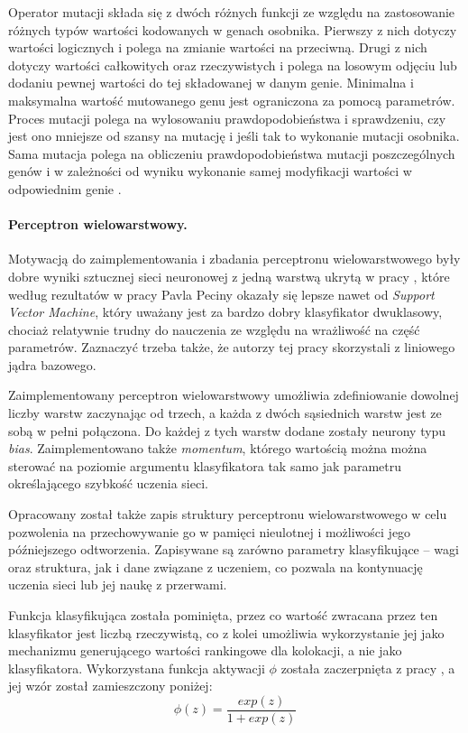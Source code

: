 \documentclass[11pt,a4paper]{llncs}
\begin{document}
 
Operator mutacji składa się z dwóch różnych funkcji ze względu na zastosowanie różnych typów wartości kodowanych w genach osobnika.
Pierwszy z nich dotyczy wartości logicznych i polega na zmianie wartości na przeciwną.
Drugi z nich dotyczy wartości całkowitych oraz rzeczywistych i polega na losowym odjęciu lub dodaniu pewnej wartości do tej składowanej w danym genie.
Minimalna i maksymalna wartość mutowanego genu jest ograniczona za pomocą parametrów.
Proces mutacji polega na wylosowaniu prawdopodobieństwa i sprawdzeniu, czy jest ono mniejsze od szansy na mutację i jeśli tak to wykonanie mutacji osobnika.
Sama mutacja polega na obliczeniu prawdopodobieństwa mutacji poszczególnych genów i w zależności od wyniku wykonanie samej modyfikacji wartości w odpowiednim genie \cite[str. 31]{klyk}.



\paragraph{Perceptron wielowarstwowy. }

Motywacją do zaimplementowania i zbadania perceptronu wielowarstwowego były dobre wyniki sztucznej sieci neuronowej z jedną warstwą ukrytą w pracy \cite{coling}, które według rezultatów w pracy Pavla Peciny okazały się lepsze nawet od \emph{Support Vector Machine}, który uważany jest za bardzo dobry klasyfikator dwuklasowy, chociaż relatywnie trudny do nauczenia ze względu na wrażliwość na część parametrów.
Zaznaczyć trzeba także, że autorzy tej pracy skorzystali z liniowego jądra bazowego.


Zaimplementowany perceptron wielowarstwowy umożliwia zdefiniowanie dowolnej liczby warstw zaczynając od trzech, a każda z dwóch sąsiednich warstw jest ze sobą w pełni połączona.
Do każdej z tych warstw dodane zostały neurony typu \emph{bias}. 
Zaimplementowano także \emph{momentum}, którego wartością można można sterować na poziomie argumentu klasyfikatora tak samo jak parametru określającego szybkość uczenia sieci.


Opracowany został także zapis struktury perceptronu wielowarstwowego w celu pozwolenia na przechowywanie go w pamięci nieulotnej i możliwości jego późniejszego odtworzenia.
Zapisywane są zarówno parametry klasyfikujące -- wagi oraz struktura, jak i dane związane z uczeniem, co pozwala na kontynuację uczenia sieci lub jej naukę z przerwami.


Funkcja klasyfikująca została pominięta, przez co wartość zwracana przez ten klasyfikator jest liczbą rzeczywistą, co z kolei umożliwia wykorzystanie jej jako mechanizmu generującego wartości rankingowe dla kolokacji, a nie jako klasyfikatora.
Wykorzystana funkcja aktywacji \( \phi \) została zaczerpnięta z pracy \cite{coling}, a jej wzór został zamieszczony poniżej:
$$ \phi(z) = \frac{exp(z)}{1 + exp(z)} $$
\end{document}
